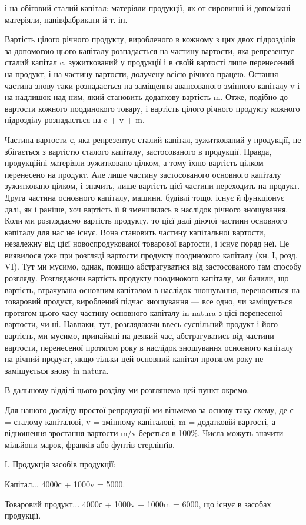 і на обіговий сталий капітал: матеріяли продукції, як от сировинні й допоміжні
матеріяли, напівфабрикати й т. ін.

Вартість цілого річного продукту, виробленого в кожному з цих
двох підрозділів за допомогою цього капіталу розпадається на частину
вартости, яка репрезентує сталий капітал c, зужиткований у продукції і в
своїй вартості лише перенесений на продукт, і на частину вартости, долучену
всією річною працею. Остання частина знову таки розпадається
на заміщення авансованого змінного капіталу v і на надлишок над ним,
який становить додаткову вартість m. Отже, подібно до вартости кожного
поодинокого товару, і вартість цілого річного продукту кожного
підрозділу розпадається на c + v + m.

Частина вартости с, яка репрезентує сталий капітал, зужиткований
у продукції, не збігається з вартістю сталого капіталу, застосованого
в продукції. Правда, продукційні матеріяли зужитковано цілком, а тому
їхню вартість цілком перенесено на продукт. Але лише частину застосованого
основного капіталу зужитковано цілком, і значить, лише вартість
цієї частини переходить на продукт. Друга частина основного капіталу,
машини, будівлі тощо, існує й функціонує далі, як і раніше, хоч
вартість її й зменшилась в наслідок річного зношування. Коли ми розглядаємо
вартість продукту, то цієї далі діючої частини основного капіталу
для нас не існує. Вона становить частину капітальної вартости, незалежну
від цієї новоспродукованої товарової вартости, і існує поряд неї. Це
виявилося уже при розгляді вартости продукту поодинокого капіталу
(кн. І, розд. VI). Тут ми мусимо, однак, покищо абстрагуватися від застосованого
там способу розгляду. Розглядаючи вартість продукту поодинокого
капіталу, ми бачили, що вартість, втрачувана основним капіталом
в наслідок зношування, переноситься на товаровий продукт,
вироблений підчас зношування — все одно, чи заміщується протягом цього
часу частину основного капіталу in natura з цієї перенесеної вартости,
чи ні. Навпаки, тут, розглядаючи ввесь суспільний продукт і його вартість,
ми мусимо, принаймні на деякий час, абстрагуватись від частини
вартости, перенесеної протягом року в наслідок зношування основного
капіталу на річний продукт, якщо тільки цей основний капітал протягом
року не заміщується знову in natura.

В дальшому відділі цього розділу ми розглянемо цей пункт окремо.

Для нашого досліду простої репродукції ми візьмемо за основу таку схему,
де с = сталому капіталові, v = змінному капіталові, m = додатковій
вартості, а відношення зростання вартости m/v береться в 100\%. Числа
можуть значити мільйони марок, франків або фунтів стерлінґів.

І. Продукція засобів продукції:

Капітал... 4000с + 1000v = 5000.

Товаровий продукт... 4000с + 1000v + 1000m = 6000, що існує
в засобах продукції.
